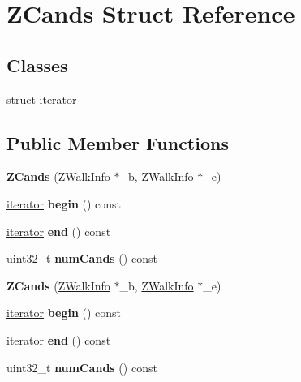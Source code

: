 \hypertarget{structZCands}{\section{Z\-Cands Struct Reference}
\label{structZCands}
}
\subsection*{Classes}
\begin{DoxyCompactItemize}
\item 
struct \hyperlink{structZCands_1_1iterator}{iterator}
\end{DoxyCompactItemize}
\subsection*{Public Member Functions}
\begin{DoxyCompactItemize}
\item 
\hypertarget{structZCands_a45c689a57d82ae2daf76411fe37f81c8}{{\bfseries Z\-Cands} (\hyperlink{structZWalkInfo}{Z\-Walk\-Info} $\ast$\-\_\-b, \hyperlink{structZWalkInfo}{Z\-Walk\-Info} $\ast$\-\_\-e)}\label{structZCands_a45c689a57d82ae2daf76411fe37f81c8}

\item 
\hypertarget{structZCands_a15e74b4a743bb5ed0d30a929c0008850}{\hyperlink{structZCands_1_1iterator}{iterator} {\bfseries begin} () const }\label{structZCands_a15e74b4a743bb5ed0d30a929c0008850}

\item 
\hypertarget{structZCands_ab00fa501162fb281147e8d599861791f}{\hyperlink{structZCands_1_1iterator}{iterator} {\bfseries end} () const }\label{structZCands_ab00fa501162fb281147e8d599861791f}

\item 
\hypertarget{structZCands_a013dea49e81176ac3eb674dabb1c00d6}{uint32\-\_\-t {\bfseries num\-Cands} () const }\label{structZCands_a013dea49e81176ac3eb674dabb1c00d6}

\item 
\hypertarget{structZCands_a45c689a57d82ae2daf76411fe37f81c8}{{\bfseries Z\-Cands} (\hyperlink{structZWalkInfo}{Z\-Walk\-Info} $\ast$\-\_\-b, \hyperlink{structZWalkInfo}{Z\-Walk\-Info} $\ast$\-\_\-e)}\label{structZCands_a45c689a57d82ae2daf76411fe37f81c8}

\item 
\hypertarget{structZCands_a15e74b4a743bb5ed0d30a929c0008850}{\hyperlink{structZCands_1_1iterator}{iterator} {\bfseries begin} () const }\label{structZCands_a15e74b4a743bb5ed0d30a929c0008850}

\item 
\hypertarget{structZCands_ab00fa501162fb281147e8d599861791f}{\hyperlink{structZCands_1_1iterator}{iterator} {\bfseries end} () const }\label{structZCands_ab00fa501162fb281147e8d599861791f}

\item 
\hypertarget{structZCands_a013dea49e81176ac3eb674dabb1c00d6}{uint32\-\_\-t {\bfseries num\-Cands} () const }\label{structZCands_a013dea49e81176ac3eb674dabb1c00d6}

\end{DoxyCompactItemize}
